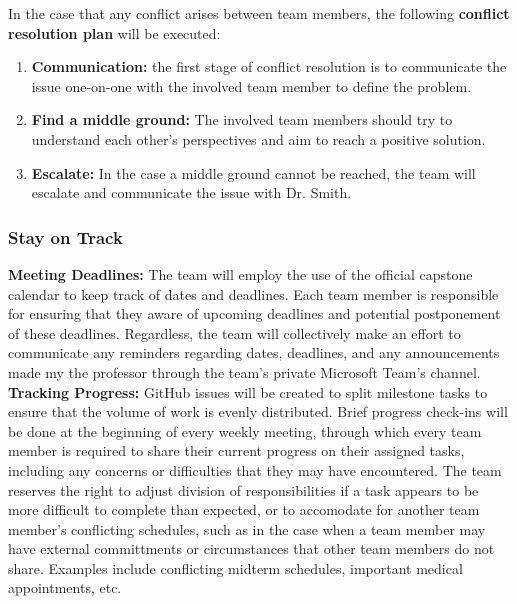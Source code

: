 \documentclass{article}
\begin{document}
\noindent In the case that any conflict arises between team members, the following \textbf{conflict resolution plan} will be executed:

\begin{enumerate}
    \item \textbf{Communication:} the first stage of conflict resolution is to communicate the issue one-on-one with the involved team member to define the problem.
    \item \textbf{Find a middle ground:} The involved team members should try to understand each other's perspectives and aim to reach a positive solution.
    \item \textbf{Escalate:} In the case a middle ground cannot be reached, the team will escalate and communicate the issue with Dr. Smith.
\end{enumerate}


\subsubsection*{Stay on Track}

\noindent\textbf{Meeting Deadlines:} The team will employ the use of the official capstone calendar to keep track of dates and deadlines. Each team member is responsible for ensuring that they aware of
upcoming deadlines and potential postponement of these deadlines. Regardless, the team will collectively make an effort to communicate any reminders regarding dates, deadlines,
and any announcements made my the professor through the team's private Microsoft Team's channel. \\

\noindent\textbf{Tracking Progress:} GitHub issues will be created to split milestone tasks to ensure that the volume of work is evenly distributed. Brief progress check-ins will be done at the beginning of every weekly meeting, through which every 
team member is required to share their current progress on their assigned tasks, including any concerns or difficulties that they may have encountered. The team reserves the right to adjust division of responsibilities if a task appears to be
more difficult to complete than expected, or to accomodate for another team member's conflicting schedules, such as in the case when a team member may have external committments or circumstances that other team members do not share. Examples include
conflicting midterm schedules, important medical appointments, etc. \\
\end{document}
